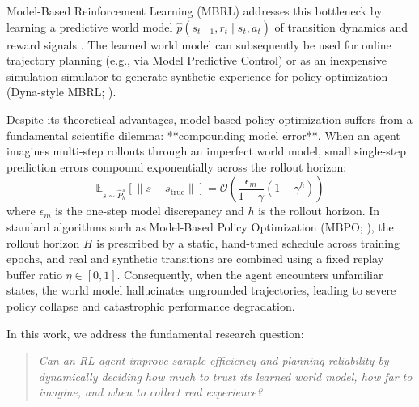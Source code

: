 \documentclass[11pt,a4paper]{article}
\theoremstyle{definition}
\theoremstyle{remark}
\begin{document}
Model-Based Reinforcement Learning (MBRL) addresses this bottleneck by learning a predictive world model $\hat{p}(s_{t+1}, r_t \mid s_t, a_t)$ of transition dynamics and reward signals \citep{chua2018pets, ha2018worldmodels, hafner2020dreamer}. The learned world model can subsequently be used for online trajectory planning (e.g., via Model Predictive Control) or as an inexpensive simulation simulator to generate synthetic experience for policy optimization (Dyna-style MBRL; \citealt{janner2019mbpo}).

Despite its theoretical advantages, model-based policy optimization suffers from a fundamental scientific dilemma: **compounding model error**. When an agent imagines multi-step rollouts through an imperfect world model, small single-step prediction errors compound exponentially across the rollout horizon:
\begin{equation}
    \mathbb{E}_{s \sim \hat{P}_h^\pi} \left[ \|s - s_{\text{true}}\| \right] = \mathcal{O}\left( \frac{\epsilon_m}{1 - \gamma} (1 - \gamma^h) \right)
\end{equation}
where $\epsilon_m$ is the one-step model discrepancy and $h$ is the rollout horizon. In standard algorithms such as Model-Based Policy Optimization (MBPO; \citealt{janner2019mbpo}), the rollout horizon $H$ is prescribed by a static, hand-tuned schedule across training epochs, and real and synthetic transitions are combined using a fixed replay buffer ratio $\eta \in [0, 1]$. Consequently, when the agent encounters unfamiliar states, the world model hallucinates ungrounded trajectories, leading to severe policy collapse and catastrophic performance degradation.

In this work, we address the fundamental research question:
\begin{quote}
    \emph{Can an RL agent improve sample efficiency and planning reliability by dynamically deciding how much to trust its learned world model, how far to imagine, and when to collect real experience?}
\end{quote}
\end{document}
